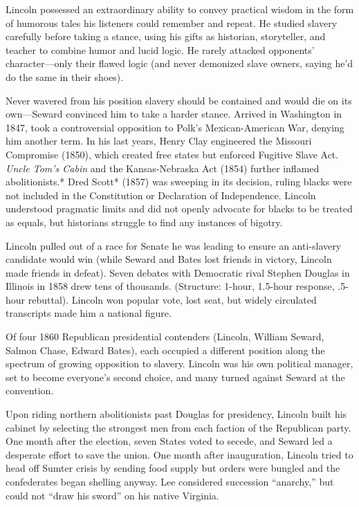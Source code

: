 \documentclass[
]{article}
\begin{document}
Lincoln possessed an extraordinary ability to convey practical wisdom in
the form of humorous tales his listeners could remember and repeat. He
studied slavery carefully before taking a stance, using his gifts as
historian, storyteller, and teacher to combine humor and lucid logic. He
rarely attacked opponents' character---only their flawed logic (and
never demonized slave owners, saying he'd do the same in their shoes).

Never wavered from his position slavery should be contained and would
die on its own---Seward convinced him to take a harder stance. Arrived
in Washington in 1847, took a controversial opposition to Polk's
Mexican-American War, denying him another term. In his last years, Henry
Clay engineered the Missouri Compromise (1850), which created free
states but enforced Fugitive Slave Act. \emph{Uncle Tom's Cabin} and the
Kansas-Nebraska Act (1854) further inflamed abolitionists.* Dred Scott*
(1857) was sweeping in its decision, ruling blacks were not included in
the Constitution or Declaration of Independence. Lincoln understood
pragmatic limits and did not openly advocate for blacks to be treated as
equals, but historians struggle to find any instances of bigotry.

Lincoln pulled out of a race for Senate he was leading to ensure an
anti-slavery candidate would win (while Seward and Bates lost friends in
victory, Lincoln made friends in defeat). Seven debates with Democratic
rival Stephen Douglas in Illinois in 1858 drew tens of thousands.
(Structure: 1-hour, 1.5-hour response, .5-hour rebuttal). Lincoln won
popular vote, lost seat, but widely circulated transcripts made him a
national figure.

Of four 1860 Republican presidential contenders (Lincoln, William
Seward, Salmon Chase, Edward Bates), each occupied a different position
along the spectrum of growing opposition to slavery. Lincoln was his own
political manager, set to become everyone's second choice, and many
turned against Seward at the convention.

Upon riding northern abolitionists past Douglas for presidency, Lincoln
built his cabinet by selecting the strongest men from each faction of
the Republican party. One month after the election, seven States voted
to secede, and Seward led a desperate effort to save the union. One
month after inauguration, Lincoln tried to head off Sumter crisis by
sending food supply but orders were bungled and the confederates began
shelling anyway. Lee considered succession ``anarchy,'' but could not
``draw his sword'' on his native Virginia.
\end{document}
